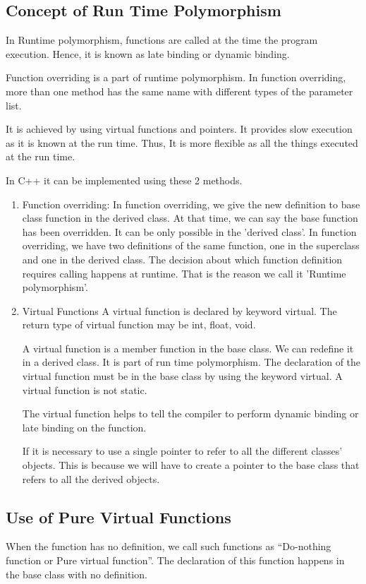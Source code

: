 \documentclass[11pt]{article}
\begin{document}
\subsection{Concept of Run Time Polymorphism}
In Runtime polymorphism, functions are called at the time the program execution. Hence, it is known as late binding or dynamic binding.

Function overriding is a part of runtime polymorphism. In function overriding, more than one method has the same name with different types of the parameter list.

It is achieved by using virtual functions and pointers. It provides slow execution as it is known at the run time. Thus, It is more flexible as all the things executed at the run time.

In C++ it can be implemented using these 2 methods.
\begin{enumerate}
	\item Function overriding:
	      In function overriding, we give the new definition to base class function in the derived class. At that time, we can say the base function has been overridden. It can be only possible in the 'derived class'. In function overriding, we have two definitions of the same function, one in the superclass and one in the derived class. The decision about which function definition requires calling happens at runtime. That is the reason we call it 'Runtime polymorphism'.


	\item Virtual Functions
	      A virtual function is declared by keyword virtual. The return type of virtual function may be int, float, void.

	      A virtual function is a member function in the base class. We can redefine it in a derived class. It is part of run time polymorphism. The declaration of the virtual function must be in the base class by using the keyword virtual. A virtual function is not static.

	      The virtual function helps to tell the compiler to perform dynamic binding or late binding on the function.

	      If it is necessary to use a single pointer to refer to all the different classes' objects. This is because we will have to create a pointer to the base class that refers to all the derived objects.
\end{enumerate}
\subsection{Use of Pure Virtual Functions}
When the function has no definition, we call such functions as “Do-nothing function or Pure virtual function”. The declaration of this function happens in the base class with no definition.
\end{document}
